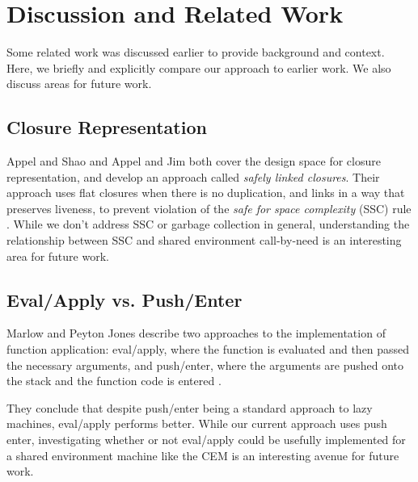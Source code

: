 \section{Discussion and Related Work} \label{sec:disc}

Some related work was discussed earlier to provide background and context. Here,
we briefly and explicitly compare our approach to earlier work. We also discuss
areas for future work.

\subsection{Closure Representation}
Appel and Shao \cite{shao1994space} and Appel and Jim \cite{appel1988optimizing}
both cover the design space for closure representation, and develop an approach
called \emph{safely linked closures}. Their approach uses flat closures when
there is no duplication, and links in a way that preserves liveness, to prevent
violation of the \emph{safe for space complexity} (SSC) rule
\cite{appel2006compiling}. While we don't address SSC or garbage collection in
general, understanding the relationship between SSC and shared environment
call-by-need is an interesting area for future work.

\subsection{Eval/Apply vs. Push/Enter}
Marlow and Peyton Jones describe two approaches to the implementation of
function application: eval/apply, where the function is evaluated and then
passed the necessary arguments, and push/enter, where the arguments are pushed
onto the stack and the function code is entered \cite{marlow2006making}.

They conclude that despite push/enter being a standard approach to lazy
machines, eval/apply performs better. While our current approach uses push
enter, investigating whether or not eval/apply could be usefully implemented for
a shared environment machine like the CEM is an interesting avenue for
future work.

